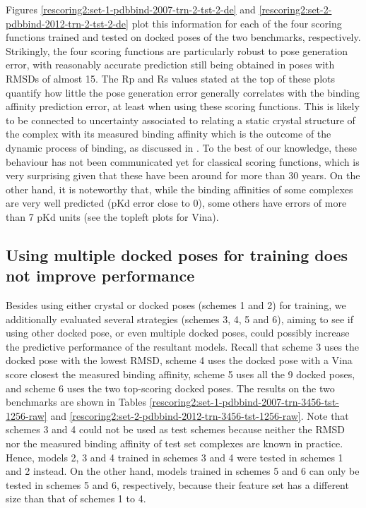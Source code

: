 \documentclass[twocolumn]{bmcart}
\begin{document}
Figures \ref{rescoring2:set-1-pdbbind-2007-trn-2-tst-2-de} and \ref{rescoring2:set-2-pdbbind-2012-trn-2-tst-2-de} plot this information for each of the four scoring functions trained and tested on docked poses of the two benchmarks, respectively. Strikingly, the four scoring functions are particularly robust to pose generation error, with reasonably accurate prediction still being obtained in poses with RMSDs of almost 15. The Rp and Rs values stated at the top of these plots quantify how little the pose generation error generally correlates with the binding affinity prediction error, at least when using these scoring functions. This is likely to be connected to uncertainty associated to relating a static crystal structure of the complex with its measured binding affinity which is the outcome of the dynamic process of binding, as discussed in \cite{1370}. To the best of our knowledge, these behaviour has not been communicated yet for classical scoring functions, which is very surprising given that these have been around for more than 30 years. On the other hand, it is noteworthy that, while the binding affinities of some complexes are very well predicted (pKd error close to 0), some others have errors of more than 7 pKd units (see the topleft plots for Vina).

\subsection*{Using multiple docked poses for training does not improve performance}

Besides using either crystal or docked poses (schemes 1 and 2) for training, we additionally evaluated several strategies (schemes 3, 4, 5 and 6), aiming to see if using other docked pose, or even multiple docked poses, could possibly increase the predictive performance of the resultant models. Recall that scheme 3 uses the docked pose with the lowest RMSD, scheme 4 uses the docked pose with a Vina score closest the measured binding affinity, scheme 5 uses all the 9 docked poses, and scheme 6 uses the two top-scoring docked poses. The results on the two benchmarks are shown in Tables \ref{rescoring2:set-1-pdbbind-2007-trn-3456-tst-1256-raw} and \ref{rescoring2:set-2-pdbbind-2012-trn-3456-tst-1256-raw}. Note that schemes 3 and 4 could not be used as test schemes because neither the RMSD nor the measured binding affinity of test set complexes are known in practice. Hence, models 2, 3 and 4 trained in schemes 3 and 4 were tested in schemes 1 and 2 instead. On the other hand, models trained in schemes 5 and 6 can only be tested in schemes 5 and 6, respectively, because their feature set has a different size than that of schemes 1 to 4.
\end{document}
